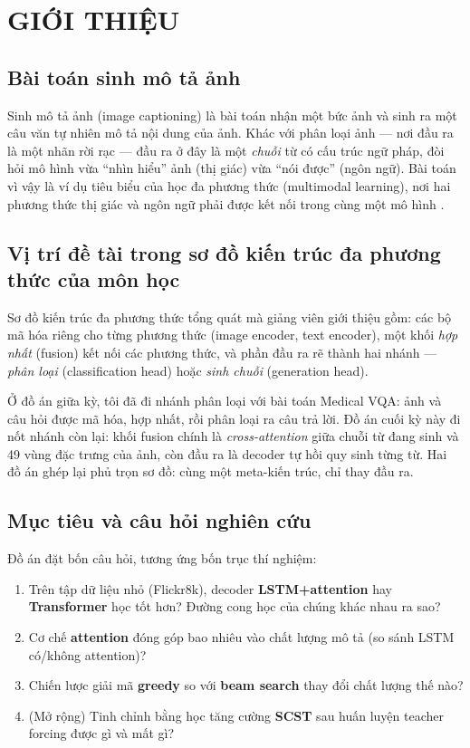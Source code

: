 \chapter{GIỚI THIỆU}
\label{chap:intro}

\section{Bài toán sinh mô tả ảnh}

Sinh mô tả ảnh (image captioning) là bài toán nhận một bức ảnh và sinh ra một
câu văn tự nhiên mô tả nội dung của ảnh. Khác với phân loại ảnh --- nơi đầu ra
là một nhãn rời rạc --- đầu ra ở đây là một \emph{chuỗi} từ có cấu trúc ngữ pháp,
đòi hỏi mô hình vừa ``nhìn hiểu'' ảnh (thị giác) vừa ``nói được'' (ngôn ngữ).
Bài toán vì vậy là ví dụ tiêu biểu của học đa phương thức (multimodal learning),
nơi hai phương thức thị giác và ngôn ngữ phải được kết nối trong cùng một mô hình
\autocite{vinyals2015show,xu2015show}.

\section{Vị trí đề tài trong sơ đồ kiến trúc đa phương thức của môn học}

Sơ đồ kiến trúc đa phương thức tổng quát mà giảng viên giới thiệu gồm: các bộ
mã hóa riêng cho từng phương thức (image encoder, text encoder), một khối
\emph{hợp nhất} (fusion) kết nối các phương thức, và phần đầu ra rẽ thành hai
nhánh --- \emph{phân loại} (classification head) hoặc \emph{sinh chuỗi}
(generation head).

Ở đồ án giữa kỳ, tôi đã đi nhánh phân loại với bài toán Medical VQA: ảnh và câu
hỏi được mã hóa, hợp nhất, rồi phân loại ra câu trả lời. Đồ án cuối kỳ này đi
nốt nhánh còn lại: khối fusion chính là \emph{cross-attention} giữa chuỗi từ đang
sinh và 49 vùng đặc trưng của ảnh, còn đầu ra là decoder tự hồi quy sinh từng từ.
Hai đồ án ghép lại phủ trọn sơ đồ: cùng một meta-kiến trúc, chỉ thay đầu ra.

\section{Mục tiêu và câu hỏi nghiên cứu}

Đồ án đặt bốn câu hỏi, tương ứng bốn trục thí nghiệm:
\begin{enumerate}
	\item Trên tập dữ liệu nhỏ (Flickr8k), decoder \textbf{LSTM+attention} hay
	      \textbf{Transformer} học tốt hơn? Đường cong học của chúng khác nhau ra sao?
	\item Cơ chế \textbf{attention} đóng góp bao nhiêu vào chất lượng mô tả
	      (so sánh LSTM có/không attention)?
	\item Chiến lược giải mã \textbf{greedy} so với \textbf{beam search} thay đổi
	      chất lượng thế nào?
	\item (Mở rộng) Tinh chỉnh bằng học tăng cường \textbf{SCST} sau huấn luyện
	      teacher forcing được gì và mất gì?
\end{enumerate}

